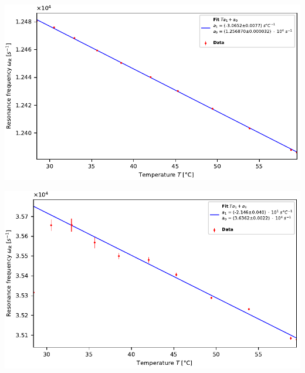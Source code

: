 \minipage{\linewidth}
    \begin{center}
        \captionsetup{type=figure}
        \begin{adjustbox}{max width=\linewidth, keepaspectratio}
            \includegraphics[]{pdf/T_1}
        \end{adjustbox}
        \label{fig:Temperaturabhaengigkeit1}
    \end{center}
\endminipage

\minipage{\linewidth}
    \begin{center}
        \captionsetup{type=figure}
        \begin{adjustbox}{max width=\linewidth, keepaspectratio}
            \includegraphics[]{pdf/T_2}
        \end{adjustbox}
        \label{fig:Temperaturabhaengigkeit2}
    \end{center}
\endminipage
